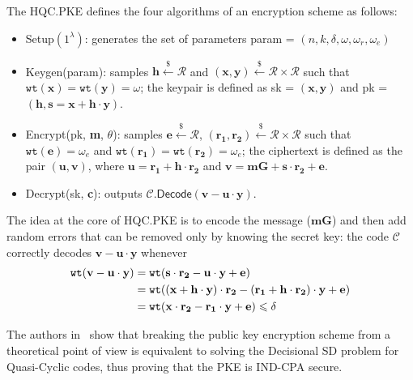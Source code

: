 The \textsf{HQC.PKE} defines the four algorithms of an encryption scheme as follows:
\begin{itemize}
    \item \textsf{Setup}$(1^\lambda)$: generates the set of parameters \textsf{param} = $(n, k, \delta, \omega, \omega_r, \omega_e)$
    \item \textsf{Keygen(param)}: samples $\mathbf{h} \xleftarrow{\mathdollar} \mathcal{R}$ and 
    $(\mathbf{x}, \mathbf{y}) \xleftarrow{\mathdollar} \mathcal{R} \times \mathcal{R}$ such that $\texttt{wt}(\mathbf{x}) = \texttt{wt}(\mathbf{y}) =\omega$;
    the keypair is defined as \textsf{sk} = $(\mathbf{x}, \mathbf{y})$ and \textsf{pk} = $(\mathbf{h}, \mathbf{s} = \mathbf{x} + \mathbf{h\cdot y})$.
    \item \textsf{Encrypt(pk, \textbf{m}, $\theta$)}: samples $\mathbf{e} \xleftarrow{\mathdollar} \mathcal{R}$, $(\mathbf{r_1}, \mathbf{r_2}) \xleftarrow{\mathdollar} \mathcal{R} \times \mathcal{R}$ such that
     $\texttt{wt}(\mathbf{e}) = \omega_e$ and $\texttt{wt}(\mathbf{r_1}) = \texttt{wt}(\mathbf{r_2}) = \omega_e$;  the ciphertext is defined as the pair
     $(\mathbf{u}, \mathbf{v})$, where $\mathbf{u} = \mathbf{r_1} + \mathbf{h}\cdot\mathbf{r_2}$ and $\mathbf{v} = \mathbf{mG} + \mathbf{s\cdot r_2} + \mathbf{e}$.
    \item \textsf{Decrypt(sk, \textbf{c})}: outputs $\mathcal{C}.\textsf{Decode}(\mathbf{v} - \mathbf{u\cdot y})$.
\end{itemize}
\newpage
The idea at the core of \textsf{HQC.PKE} is to encode the message ($\mathbf{mG}$) and then add random errors that can be removed only by knowing the secret key: the code $\mathcal{C}$ correctly decodes $\mathbf{v-u\cdot y}$ whenever
\begin{equation*}
	\begin{aligned}
		\tt{wt}(\mathbf{v-u\cdot y}) &= \tt{wt}(\bf{s\cdot r_2-u\cdot y+e}) \\
							   &= \tt{wt}(\bf{(x+h\cdot y)\cdot r_2-(r_1+h\cdot r_2)\cdot y +e})\\
							   &= \tt{wt}(\bf{x\cdot r_2-r_1\cdot y+e}) \leqslant \delta
	\end{aligned}
\end{equation*}

The authors in~\cite{DBLP:journals/tit/Aguilar-Melchor18} show that breaking the public key encryption scheme from a theoretical point of view is equivalent to solving the 
Decisional \textsf{SD} problem for Quasi-Cyclic codes, thus proving that the PKE is IND-CPA secure.

